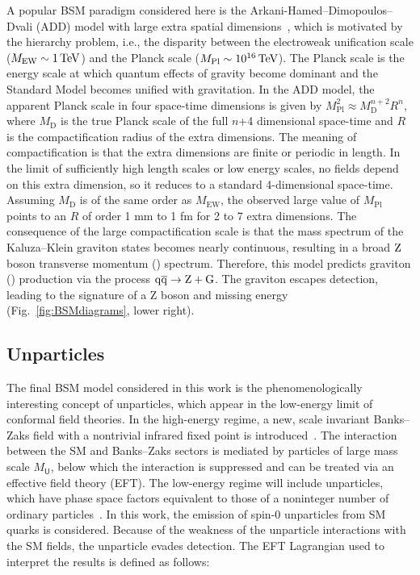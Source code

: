 A popular BSM paradigm considered here is the Arkani-Hamed--Dimopoulos--Dvali (ADD) model with large extra spatial dimensions~\cite{arkani98:hlz,arkani99:hlz,han99:hlz}, which
is motivated by the hierarchy problem, i.e., the disparity between the electroweak unification
scale ($M_\mathrm{EW} \sim 1\,\text{Te\hspace{-.08em}V}$) and the Planck scale ($M_\mathrm{Pl} \sim 10^{16}\,\text{Te\hspace{-.08em}V}$).
The Planck scale is the energy scale at which quantum effects of gravity become dominant and the Standard Model becomes unified with gravitation.
In the ADD model, the apparent Planck scale in four space-time dimensions
is given by $M_\mathrm{Pl}^2 \approx M_\mathrm{D}^{n+2}R^n$, where $M_\mathrm{D}$ is the true Planck scale of
the full $n$+4 dimensional space-time and $R$ is the compactification radius of the extra
dimensions.
The meaning of compactification is that the extra dimensions are finite or periodic in length.
In the limit of sufficiently high length scales or low energy scales, no fields depend on this extra dimension, so it reduces to a standard 4-dimensional space-time.
Assuming $M_\mathrm{D}$ is of the same order as $M_\mathrm{EW}$, the observed large value
of $M_\mathrm{Pl}$ points to an $R$ of order 1 mm to 1 fm for 2 to 7 extra dimensions.
The consequence of the large compactification scale is that the mass spectrum of the
Kaluza--Klein graviton states becomes nearly continuous, resulting in a broad $\mathrm{Z}$ boson transverse momentum (\PT) spectrum.
Therefore, this model predicts graviton (\cPG) production via the process $\mathrm{q}\overline{\mathrm{q}} \rightarrow \mathrm{Z} + \mathrm{G}$.
The graviton escapes detection, leading to the signature of a Z boson and missing energy (Fig.~\ref{fig:BSMdiagrams}, lower right).

\subsection{Unparticles}

The final BSM model considered in this work is the phenomenologically interesting concept of unparticles, which appear in the low-energy limit of conformal field theories.
In the high-energy regime, a new, scale invariant Banks--Zaks field with a nontrivial infrared fixed point is introduced~\cite{Banks:1981nn}.
The interaction between the SM and Banks--Zaks sectors is mediated by particles of large mass scale $M_{\textsf{U}}$, below which the interaction is suppressed and can be treated
via an effective field theory (EFT). The low-energy regime will include unparticles, which have phase space factors equivalent to those of a noninteger
number of ordinary particles~\cite{Kang:2014cia,Rinaldi:2014gha,Cheng:1988zx}. 
In this work, the emission of spin-0 unparticles from SM quarks is considered.
Because of the weakness of the unparticle interactions with the SM fields, the unparticle evades detection.
The EFT Lagrangian used to interpret the results is defined as follows:

